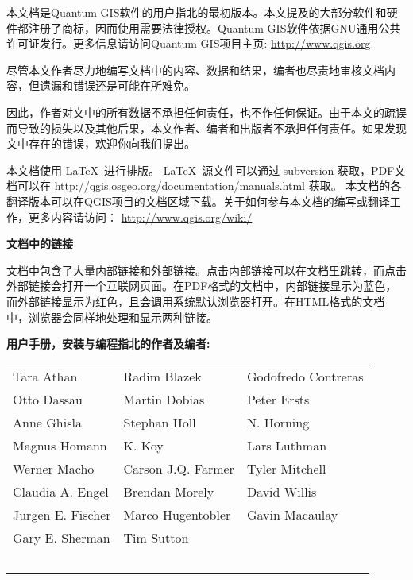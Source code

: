 \frontmatter
\pagestyle{scrplain}
\vspace{1cm}


本文档是Quantum GIS软件的用户指北的最初版本。本文提及的大部分软件和硬件都注册了商标，因而使用需要法律授权。Quantum GIS软件依据GNU通用公共许可证发行。更多信息请访问Quantum GIS项目主页:
\url{http://www.qgis.org}.
\par\bigskip
尽管本文作者尽力地编写文档中的内容、数据和结果，编者也尽责地审核文档内容，但遗漏和错误还是可能在所难免。
\par\bigskip
因此，作者对文中的所有数据不承担任何责任，也不作任何保证。由于本文的疏误而导致的损失以及其他后果，本文作者、编者和出版者不承担任何责任。如果发现文中存在的错误，欢迎你向我们提出。
\par\bigskip
本文档使用 \LaTeX~进行排版。 \LaTeX~源文件可以通过 \href{http://wiki.qgis.org/qgiswiki/DocumentationWritersCorner}{subversion} 
获取，PDF文档可以在 \url{http://qgis.osgeo.org/documentation/manuals.html} 获取。 
本文档的各翻译版本可以在QGIS项目的文档区域下载。关于如何参与本文档的编写或翻译工作，更多内容请访问： \url{http://www.qgis.org/wiki/} 

\vspace{1cm}
\noindent
\textbf{文档中的链接}
\par\bigskip
文档中包含了大量内部链接和外部链接。点击内部链接可以在文档里跳转，而点击外部链接会打开一个互联网页面。在PDF格式的文档中，内部链接显示为蓝色，而外部链接显示为红色，且会调用系统默认浏览器打开。在HTML格式的文档中，浏览器会同样地处理和显示两种链接。

\newpage

\begin{flushleft}
\textbf{用户手册，安装与编程指北的作者及编者:}
  \par\bigskip\noindent
\begin{tabular}{p{4cm} p{4cm} p{4cm}}
Tara Athan & Radim Blazek & Godofredo Contreras \\
Otto Dassau & Martin Dobias & Peter Ersts \\
Anne Ghisla & Stephan Holl & N. Horning \\
Magnus Homann & K. Koy & Lars Luthman \\ 
Werner Macho & Carson J.Q. Farmer & Tyler Mitchell \\
Claudia A. Engel & Brendan Morely & David Willis \\
Jurgen E. Fischer & Marco Hugentobler & Gavin Macaulay \\
Gary E. Sherman & Tim Sutton \\ \
\end{tabular}
\end{flushleft}

